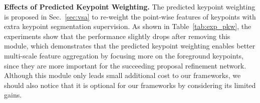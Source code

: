 \documentclass[natbib,twocolumn]{svjour3}          \smartqed  \usepackage{graphicx}
\begin{document}
\begin{table}
	\begin{center}
	\end{center}
	\caption{Effects of Predicted Keypoint Weighting module.  All experiments are conducted on our PV-RCNN++ framework with a center-based RPN head.}
	\label{tab:exp_pkw}
	\vspace{-2mm}
\end{table}

\noindent
\textbf{Effects of Predicted Keypoint Weighting.} 
The predicted keypoint weighting is proposed in Sec.~\ref{sec:vsa} to re-weight the point-wise features of keypoints with extra keypoint segmentation supervision. 
As shown in Table~\ref{tab:exp_pkw}, the experiments 
show that the performance slightly drops after removing this module, which demonstrates that the predicted keypoint weighting enables better multi-scale feature aggregation by focusing more on the foreground keypoints, since they are more important for the succeeding proposal refinement network. 
Although this module only leads small additional cost to our frameworks, we should also notice that it is optional for our frameworks by considering its limited gains.
\end{document}
